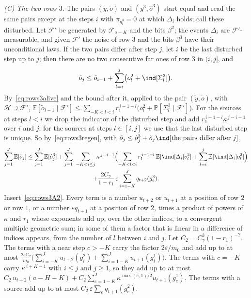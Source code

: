 \documentclass[11pt]{amsart}
\theoremstyle{definition}
\theoremstyle{remark}
\newcommand{\eps}{\varepsilon}
\newcommand{\PP}{\mathbb{P}}
\newcommand{\EE}{\mathbb{E}}
\newcommand{\cF}{\mathcal{F}}
\begin{document}
\emph{(C) The two rows $3$.} The pairs $(\tilde y,\tilde o)$ and $(y^3,\hat o^3)$ start equal and
read the same pairs except at the steps $i$ with $\pi_{g^3_i}=0$ at which $\Delta_i$ holds; call
these disturbed. Let $\mathcal F'$ be generated by $\cF_{a-K}$ and the bits $\beta^2$; the events
$\Delta_i$ are $\mathcal F'$-measurable, and given $\mathcal F'$ the noise of row $3$ and the bits
$\beta^3$ have their unconditional laws. If the two pairs differ after step $j$, let $i$ be the
last disturbed step up to $j$; then there are no two consecutive far ones of row $3$ in $(i,j]$,
and
\[
\tilde o_j\le\tilde o_{i-1}+\sum_{l=i}^{j}\bigl(o^2_l+\ind[\Sigma^3_l]\bigr).
\]
By~\eqref{eq:rows3alive} and the bound after it, applied to the pair $(\tilde y,\tilde o)$, with
$\mathcal H\supseteq\mathcal F'$,
$\EE[\tilde o_{i-1}\mid\mathcal F']\le\sum_{-K<l<i}r_1^{\,i-1-l}\bigl(o^2_l+\PP[\Sigma^3_l\mid\mathcal F']\bigr)$.
For the sources at steps $l<i$ we drop the indicator of the disturbed step and add
$r_1^{\,i-1-l}\kappa^{\,j-i-1}$ over $i$ and $j$; for the sources at steps $l\in[i,j]$ we use that
the last disturbed step is unique. So
by~\eqref{eq:rows3regen}, with $\tilde o_j\le\hat o^3_j+\tilde o_j\ind[\text{the pairs differ after }j]$,
\begin{multline}\label{eq:rows3C}
\sum_{j=1}^{J}\EE[\tilde o_j]\le\sum_{j=1}^{J}\EE[\hat o^3_j]
+\sum_{j=1}^{J}\ \sum_{-K<i\le j}\kappa^{\,j-i-1}\Bigl(\sum_{-K<l<i}r_1^{\,i-1-l}\,\EE[\ind[\Delta_i]o^2_l]+\sum_{l=i}^{j}\EE[\ind[\Delta_i]o^2_l]\Bigr)\\
+\frac{2C_\gamma}{1-r_1}\,\eps\sum_{i=1-K}^{J}q_{t+2}(g^3_i).
\end{multline}
Insert~\eqref{eq:rows3A2}. Every term is a number $u_{t+2}$ or $u_{t+1}$ at a position of row $2$
or row $1$, or a number $\eps q_{t+1}$ at a position of row $2$, times a product of powers of
$\kappa$ and $r_1$ whose exponents add up, over the other indices, to a convergent multiple
geometric sum; in some of them a factor that is linear in a difference of indices appears, from
the number of $l$ between $i$ and $j$. Let $C_2=C_\gamma^3(1-r_1)^{-2}$. The terms with a near step $c>-K$ carry the
factor $2\eps/m_0$ and add up to at most
$\frac{2\eps C_2}{m_0}\bigl(\sum_{i=-K}^{J}u_{t+2}(g^2_i)+\sum_{i=1-K}^{J}u_{t+1}(g^1_i)\bigr)$.
The terms with $c=-K$ carry $\kappa^{\,i+K-1}$ with $i\le j$ and $j\ge1$, so they add up to at
most $C_2\,u_{t+2}(a-H-K)+C_2\sum_{e=1-K}^{J}\kappa^{\max(e,1)/2}u_{t+1}(g^1_e)$. The terms with
a source add up to at most $C_2\,\eps\sum_{e}q_{t+1}(g^2_e)$.
\end{document}
